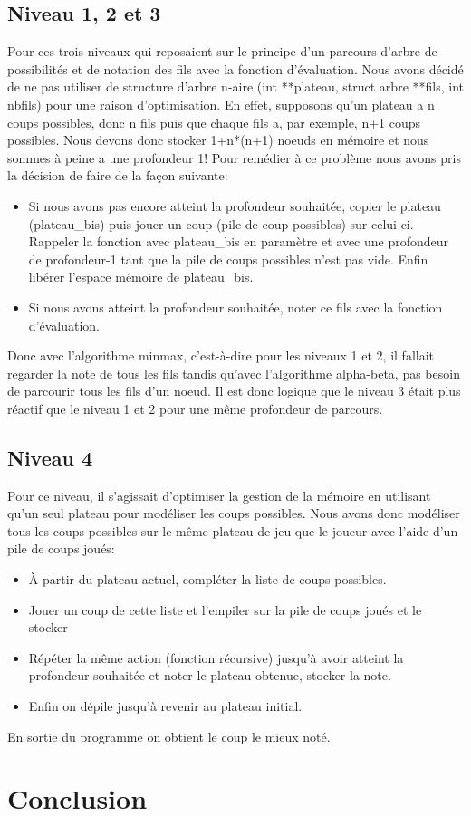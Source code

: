 \documentclass[a4paper, 11pt]{article}
\begin{document}
\subsection{Niveau 1, 2 et 3}
Pour ces trois niveaux qui reposaient sur le principe d'un parcours d'arbre de possibilités et de notation des fils avec la fonction d'évaluation. Nous avons décidé de ne pas utiliser de structure d'arbre n-aire (int **plateau, struct arbre **fils, int nbfils) pour une raison d'optimisation.
\newline
En effet, supposons qu'un plateau a n coups possibles, donc n fils puis que chaque fils a, par exemple, n+1 coups possibles. Nous devons donc stocker 1+n*(n+1) noeuds en mémoire et nous sommes à peine a une profondeur 1!
\newline
Pour remédier à ce problème nous avons pris la décision de faire de la façon suivante:
\begin{itemize}
\item Si nous avons pas encore atteint la profondeur souhaitée, copier le plateau (plateau\_bis) puis jouer un coup (pile de coup possibles) sur celui-ci. Rappeler la fonction avec plateau\_bis en paramètre et avec une profondeur de profondeur-1 tant que la pile de coups possibles n'est pas vide. Enfin libérer l'espace mémoire de plateau\_bis.
\item Si nous avons atteint la profondeur souhaitée, noter ce fils avec la fonction d'évaluation.
\end{itemize}
Donc avec l'algorithme minmax, c'est-à-dire pour les niveaux 1 et 2, il fallait regarder la note de tous les fils tandis qu'avec l'algorithme alpha-beta, pas besoin de parcourir tous les fils d'un noeud. Il est donc logique que le niveau 3 était plus réactif que le niveau 1 et 2 pour une même profondeur de parcours.
\subsection{Niveau 4}
Pour ce niveau, il s'agissait d'optimiser la gestion de la mémoire en utilisant qu'un seul plateau pour modéliser les coups possibles. Nous avons donc modéliser tous les coups possibles sur le même plateau de jeu que le joueur avec l'aide d'un pile de coups joués:
\begin{itemize}
\item À partir du plateau actuel, compléter la liste de coups possibles.
\item Jouer un coup de cette liste et l'empiler sur la pile de coups joués et le stocker
\item Répéter la même action (fonction récursive) jusqu'à avoir atteint la profondeur souhaitée et noter le plateau obtenue, stocker la note.
\item Enfin on dépile jusqu'à revenir au plateau initial.
\end{itemize}
En sortie du programme on obtient le coup le mieux noté.
\section{Conclusion}
\end{document}
